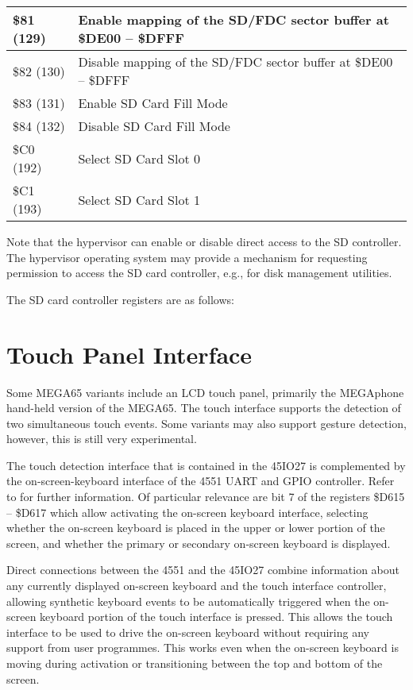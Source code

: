\begin{longtable}{|L{2.4cm}|L{8cm}|}
 \hline
\small \$81 (129) & Enable mapping of the SD/FDC sector buffer at
\$DE00 -- \$DFFF \\
 \hline
\small \$82 (130) & Disable mapping of the SD/FDC sector buffer at
\$DE00 -- \$DFFF \\
 \hline
\small \$83 (131) & Enable SD Card Fill Mode \\
 \hline
\small \$84 (132) & Disable SD Card Fill Mode \\
 \hline
\small \$C0 (192) & Select SD Card Slot 0 \\
 \hline
\small \$C1 (193) & Select SD Card Slot 1 \\
 \hline
   \end{longtable}


Note that the hypervisor can enable or disable direct access to the SD
controller. The hypervisor operating system may provide a mechanism
for requesting permission to access the SD card controller, e.g., for
disk management utilities.

The SD card controller registers are as follows:



\section{Touch Panel Interface}

Some MEGA65 variants include an LCD touch panel, primarily the
MEGAphone hand-held version of the MEGA65.  The touch interface
supports the detection of two simultaneous touch events.  Some
variants may also support gesture detection, however, this is still
very experimental.

The touch detection interface that is contained in the 45IO27 is
complemented by the on-screen-keyboard interface of the 4551 UART and
GPIO controller.  Refer to  for further
information.  Of particular relevance are bit 7 of the registers \$D615 --
\$D617 which allow activating the on-screen keyboard interface,
selecting whether the on-screen keyboard is placed in the upper or
lower portion of the screen, and whether the primary or secondary
on-screen keyboard is displayed.

Direct connections between the 4551 and the 45IO27 combine information
about any currently displayed on-screen keyboard and the touch
interface controller, allowing synthetic keyboard events to be
automatically triggered when the on-screen keyboard portion of the
touch interface is pressed.  This allows the touch interface to be
used to drive the on-screen keyboard without requiring any support
from user programmes. This works even when the on-screen keyboard is
moving during activation or transitioning between the top and bottom
of the screen.

